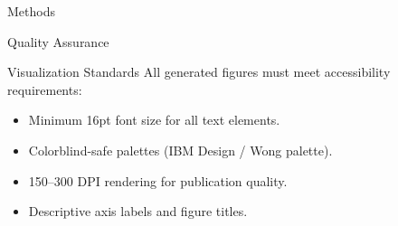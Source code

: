\documentclass[
  ignorenonframetext,
]{beamer}
\providecommand{\tightlist}{%
  \setlength{\itemsep}{0pt}\setlength{\parskip}{0pt}}
\begin{document}
\begin{frame}[fragile]{Methods}
\begin{block}{Quality Assurance}
\begin{block}{Visualization Standards}
\protect{}\label{visualization-standards}
All generated figures must meet accessibility requirements:

\begin{itemize}
\tightlist
\item
  Minimum 16pt font size for all text elements.
\item
  Colorblind-safe palettes (IBM Design / Wong palette).
\item
  150--300 DPI rendering for publication quality.
\item
  Descriptive axis labels and figure titles.
\end{itemize}
\end{block}
\end{block}
\end{frame}
\end{document}
